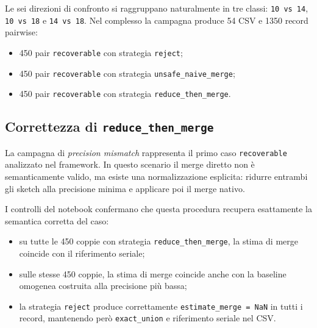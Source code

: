 Le sei direzioni di confronto si raggruppano naturalmente in tre classi:
\texttt{10 vs 14}, \texttt{10 vs 18} e \texttt{14 vs 18}. Nel complesso la
campagna produce 54 CSV e 1350 record pairwise:
\begin{itemize}
    \item 450 pair \texttt{recoverable} con strategia \texttt{reject};
    \item 450 pair \texttt{recoverable} con strategia
    \texttt{unsafe\_naive\_merge};
    \item 450 pair \texttt{recoverable} con strategia
    \texttt{reduce\_then\_merge}.
\end{itemize}

\subsection{Correttezza di \texttt{reduce\_then\_merge}}

La campagna di \emph{precision mismatch} rappresenta il primo caso
\texttt{recoverable} analizzato nel framework. In questo scenario il merge
diretto non è semanticamente valido, ma esiste una normalizzazione esplicita:
ridurre entrambi gli sketch alla precisione minima e applicare poi il merge
nativo.

I controlli del notebook confermano che questa procedura recupera esattamente
la semantica corretta del caso:
\begin{itemize}
    \item su tutte le 450 coppie con strategia \texttt{reduce\_then\_merge},
    la stima di merge coincide con il riferimento seriale;
    \item sulle stesse 450 coppie, la stima di merge coincide anche con la
    baseline omogenea costruita alla precisione più bassa;
    \item la strategia \texttt{reject} produce correttamente
    \texttt{estimate\_merge = NaN} in tutti i record, mantenendo però
    \texttt{exact\_union} e riferimento seriale nel CSV.
\end{itemize}


